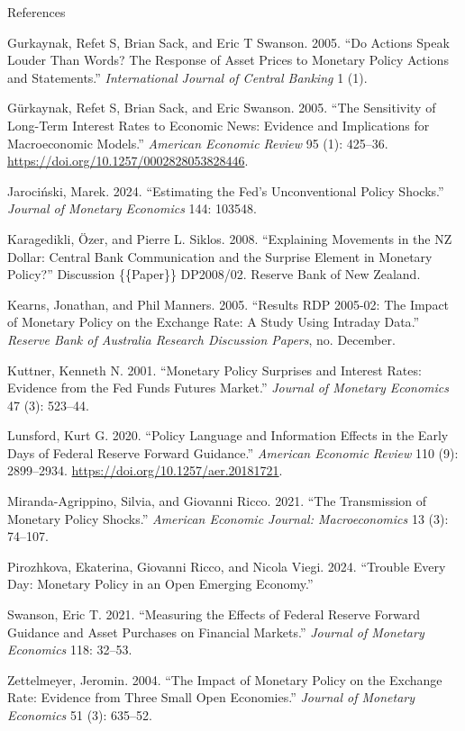 \documentclass[
  ignorenonframetext,
  aspectratio=141,
]{beamer}
\newlength{\cslhangindent}
\newenvironment{CSLReferences}[2] %
 {\begin{list}{}{%
  \setlength{\itemindent}{0pt}
  \setlength{\leftmargin}{0pt}
  \setlength{\parsep}{0pt}
  \ifodd #1
   \setlength{\leftmargin}{\cslhangindent}
   \setlength{\itemindent}{-1\cslhangindent}
  \fi
  \setlength{\itemsep}{#2\baselineskip}}}
 {\end{list}}
\begin{document}
\begin{frame}[allowframebreaks]{References}
\begin{CSLReferences}{1}{0}
Gurkaynak, Refet S, Brian Sack, and Eric T Swanson. 2005. {``Do {Actions
Speak Louder Than Words}? {The Response} of {Asset Prices} to {Monetary
Policy Actions} and {Statements}.''} \emph{International Journal of
Central Banking} 1 (1).

Gürkaynak, Refet S, Brian Sack, and Eric Swanson. 2005. {``The
{Sensitivity} of {Long-Term Interest Rates} to {Economic News}:
{Evidence} and {Implications} for {Macroeconomic Models}.''}
\emph{American Economic Review} 95 (1): 425--36.
\url{https://doi.org/10.1257/0002828053828446}.

Jarociński, Marek. 2024. {``Estimating the {Fed}'s Unconventional Policy
Shocks.''} \emph{Journal of Monetary Economics} 144: 103548.

Karagedikli, Özer, and Pierre L. Siklos. 2008. {``Explaining {Movements}
in the {NZ Dollar}: {Central Bank Communication} and the {Surprise
Element} in {Monetary Policy}?''} Discussion \{\{Paper\}\} DP2008/02.
Reserve Bank of New Zealand.

Kearns, Jonathan, and Phil Manners. 2005. {``Results\textbar{} {RDP}
2005-02: {The Impact} of {Monetary Policy} on the {Exchange Rate}: {A
Study Using Intraday Data}.''} \emph{Reserve Bank of Australia Research
Discussion Papers}, no. December.

Kuttner, Kenneth N. 2001. {``Monetary Policy Surprises and Interest
Rates: {Evidence} from the {Fed} Funds Futures Market.''} \emph{Journal
of Monetary Economics} 47 (3): 523--44.

Lunsford, Kurt G. 2020. {``Policy {Language} and {Information Effects}
in the {Early Days} of {Federal Reserve Forward Guidance}.''}
\emph{American Economic Review} 110 (9): 2899--2934.
\url{https://doi.org/10.1257/aer.20181721}.

Miranda-Agrippino, Silvia, and Giovanni Ricco. 2021. {``The Transmission
of Monetary Policy Shocks.''} \emph{American Economic Journal:
Macroeconomics} 13 (3): 74--107.

Pirozhkova, Ekaterina, Giovanni Ricco, and Nicola Viegi. 2024.
{``Trouble Every Day: {Monetary} Policy in an Open Emerging Economy.''}

Swanson, Eric T. 2021. {``Measuring the Effects of Federal Reserve
Forward Guidance and Asset Purchases on Financial Markets.''}
\emph{Journal of Monetary Economics} 118: 32--53.

Zettelmeyer, Jeromin. 2004. {``The Impact of Monetary Policy on the
Exchange Rate: Evidence from Three Small Open Economies.''}
\emph{Journal of Monetary Economics} 51 (3): 635--52.

\end{CSLReferences}
\end{frame}
\end{document}
